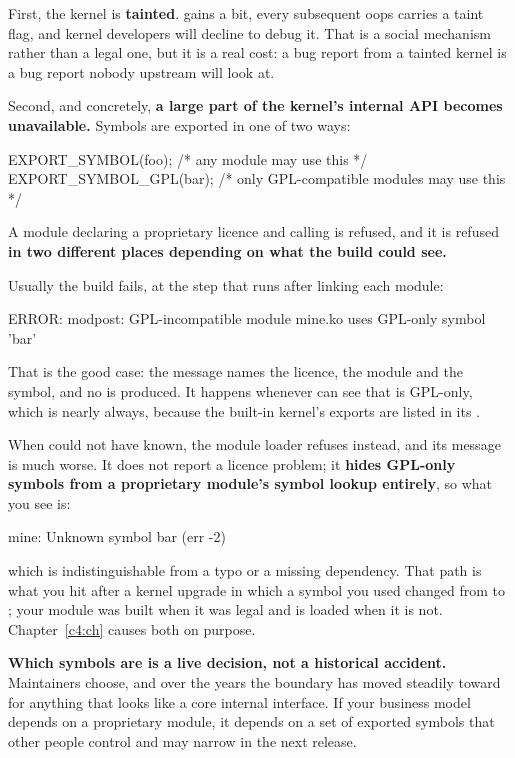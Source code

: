 First, the kernel is \textbf{tainted}.  gains a bit, every subsequent
oops carries a taint flag, and kernel developers will decline to debug it. That is a social
mechanism rather than a legal one, but it is a real cost: a bug report from a tainted kernel is a
bug report nobody upstream will look at.

Second, and concretely, \textbf{a large part of the kernel's internal API becomes unavailable.}
Symbols are exported in one of two ways:

\begin{ccode}
EXPORT_SYMBOL(foo);      /* any module may use this */
EXPORT_SYMBOL_GPL(bar);  /* only GPL-compatible modules may use this */
\end{ccode}

\noindent A module declaring a proprietary licence and calling  is refused, and it is
refused \textbf{in two different places depending on what the build could see.}

Usually the build fails, at the  step that runs after linking each module:

\begin{console}
ERROR: modpost: GPL-incompatible module mine.ko uses GPL-only symbol 'bar'
\end{console}

\noindent That is the good case: the message names the licence, the module and the symbol, and no
 is produced. It happens whenever  can see that  is GPL-only,
which is nearly always, because the built-in kernel's exports are listed in its
.

When  could not have known, the module loader refuses instead, and its message is much
worse. It does not report a licence problem; it \textbf{hides GPL-only symbols from a proprietary
module's symbol lookup entirely}, so what you see is:

\begin{console}
mine: Unknown symbol bar (err -2)
\end{console}

\noindent which is indistinguishable from a typo or a missing dependency. That path is what you hit
after a kernel upgrade in which a symbol you used changed from  to
; your module was built when it was legal and is loaded when it is not.
Chapter~\ref{c4:ch} causes both on purpose.

\textbf{Which symbols are  is a live decision, not a historical accident.} Maintainers
choose, and over the years the boundary has moved steadily toward  for anything that
looks like a core internal interface. If your business model depends on a proprietary module, it
depends on a set of exported symbols that other people control and may narrow in the next release.

